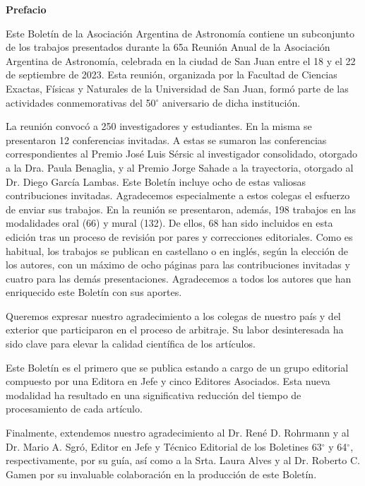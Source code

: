 \documentclass[11pt]{article}
\begin{document}
{\bf Prefacio}
\vspace{4.15pt}




Este Bolet\'in de la Asociaci\'on Argentina de Astronom\'ia contiene un subconjunto  de los trabajos presentados durante la 65a Reuni\'on Anual de la Asociaci\'on Argentina de Astronom\'ia, celebrada en la ciudad de San Juan entre el 18 y el 22 de septiembre de 2023. Esta reuni\'on, organizada por la Facultad de Ciencias Exactas, F\'isicas y Naturales de la Universidad de San Juan, form\'o parte de las actividades conmemorativas del 50$^\circ$ aniversario de dicha instituci\'on.

La reuni\'on convoc\'o a 250 investigadores y estudiantes. En la misma se presentaron 12 conferencias invitadas. A estas se sumaron las conferencias correspondientes al Premio José Luis Sérsic al investigador consolidado, otorgado a la Dra. Paula Benaglia, y al Premio Jorge Sahade a la trayectoria, otorgado al Dr. Diego García Lambas. Este Bolet\'in incluye ocho de estas valiosas contribuciones invitadas. Agradecemos especialmente a estos colegas el esfuerzo de enviar sus trabajos.  En la reuni\'on se presentaron, adem\'as, 198 trabajos en las modalidades oral (66) y mural (132). De ellos,  68 han sido incluidos en esta edici\'on tras un proceso de revisi\'on por pares y correcciones editoriales. Como es habitual, los trabajos se publican en castellano o en ingl\'es, seg\'un la elecci\'on de los autores, con un m\'aximo de ocho p\'aginas para las contribuciones invitadas y cuatro para las dem\'as presentaciones. Agradecemos a todos los autores que han enriquecido este Bolet\'in con sus aportes.

Queremos  expresar nuestro agradecimiento a los colegas de nuestro pa\'is y del exterior que participaron en el proceso de arbitraje. Su labor desinteresada ha sido clave para elevar la calidad cient\'ifica de los art\'iculos.

Este Bolet\'in es el primero que se publica estando a cargo de un grupo editorial compuesto  por una Editora en Jefe y cinco Editores Asociados. Esta nueva modalidad ha resultado en una significativa reducci\'on del tiempo de procesamiento de cada art\'iculo.

Finalmente, extendemos nuestro agradecimiento al Dr. Ren\'e D. Rohrmann y al Dr. Mario A. Sgr\'o, Editor en Jefe y T\'ecnico Editorial de los Boletines 63$^\circ$ y 64$^\circ$, respectivamente, por su gu\'ia, as\'i como a la Srta. Laura Alves y al Dr. Roberto C. Gamen por su invaluable colaboraci\'on en la producci\'on de este Bolet\'in.
\end{document}
